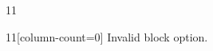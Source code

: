 \documentclass[paper=A4]{ropas-poster}
\begin{document}
\begin{postergrid}{1}{1}
\begin{posterblock}{1}{1}[column-count=0]
Invalid block option.
\end{posterblock}
\end{postergrid}
\end{document}
